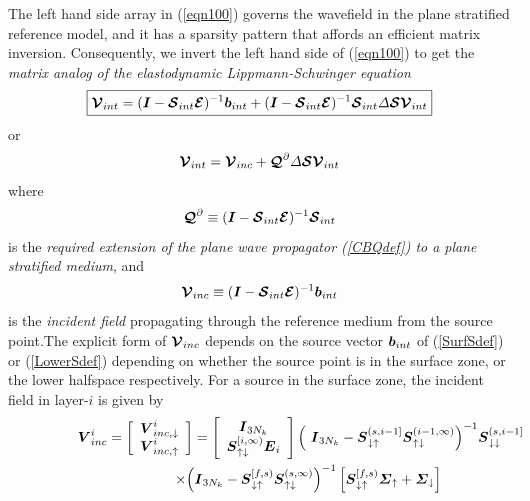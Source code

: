 The left hand side array in (\ref{eqn100}) governs the wavefield in the 
plane stratified reference model, and it has a sparsity pattern that 
affords an efficient matrix inversion. Consequently, we invert the left hand side 
of (\ref{eqn100}) to get the {\em matrix 
analog of the elastodynamic Lippmann-Schwinger equation\/}
\begin{equation} \label{LSmat}
\fbox{$\displaystyle
{\mbox{\boldmath$\cal V$\unboldmath}}_{{int}}=({\mbox{\boldmath$\mit I$\unboldmath}}-{\mbox{\boldmath$\cal S$\unboldmath}}_{{int}}{\mbox{\boldmath$\cal E$\unboldmath}})^{-1}{\mbox{\boldmath$\mit b$\unboldmath}}_{{int}}+
({\mbox{\boldmath$\mit I$\unboldmath}}-{\mbox{\boldmath$\cal S$\unboldmath}}_{{int}}{\mbox{\boldmath$\cal E$\unboldmath}})^{-1}{\mbox{\boldmath$\cal S$\unboldmath}}_{{int}} {\mit \Delta} 
{\mbox{\boldmath$\cal S$\unboldmath}}{\mbox{\boldmath$\cal V$\unboldmath}}_{{int}}
$}
\end{equation}
or
\[
{\mbox{\boldmath$\cal V$\unboldmath}}_{{int}}
={\mbox{\boldmath$\cal V$\unboldmath}}_{{inc}} + {\mbox{\boldmath$\cal Q$\unboldmath}}^{\partial} {\mit \Delta} {\mbox{\boldmath$\cal S$\unboldmath}}{\mbox{\boldmath$\cal V$\unboldmath}}_{{int}}
\]
where
\begin{equation}	\label{PstratDef}
	{\mbox{\boldmath$\cal Q$\unboldmath}}^{\partial}\equiv 
	({\mbox{\boldmath$\mit I$\unboldmath}}-{\mbox{\boldmath$\cal S$\unboldmath}}_{{int}}{\mbox{\boldmath$\cal E$\unboldmath}})^{-1}{\mbox{\boldmath$\cal S$\unboldmath}}_{{int}}
\end{equation}
is the {\em required extension of the plane wave propagator  (\ref{CBQdef}) to a plane stratified 
medium\/}, and
\begin{equation}	\label{sourceV}
	{\mbox{\boldmath$\cal V$\unboldmath}}_{{inc}}\equiv 
	({\mbox{\boldmath$\mit I$\unboldmath}}-{\mbox{\boldmath$\cal S$\unboldmath}}_{{int}}{\mbox{\boldmath$\cal E$\unboldmath}})^{-1}{\mbox{\boldmath$\mit b$\unboldmath}}_{{int}}
\end{equation}
is the {\em incident field\/} propagating through the reference medium 
from the source point.The  explicit form of ${\mbox{\boldmath$\cal V$\unboldmath}}_{{inc}}$
 depends on the source vector ${\mbox{\boldmath$\mit b$\unboldmath}}_{{int}}$ of (\ref{SurfSdef}) 
 or (\ref{LowerSdef}) depending on whether the source point is in the surface 
zone, or the lower halfspace respectively.
 For a source in the surface zone, the incident field in layer-$i$ is 
 given by 
\begin{eqnarray} \label{incdown}
\lefteqn{
{\bmi  V}_{{inc}}^{ i}=\left[{\begin{array}{c}{\bmi  V}_{{inc},\downarrow}^{ 
i}\\ 
{\bmi  V}_{{inc},\uparrow}^{ i}\end{array}}\right]=
\left[{\begin{array}{c}{\bmi  I}_{ 3 N_k}\\ 
{\bmi S}{}_{\uparrow\downarrow }^{[i, 
\infty)}{{\bmi E}}_{i}\end{array}}\right] {\left({\ {\bmi  I}_{ 3 N_k} -
{\bmi S}{}_{\downarrow\uparrow }^{({s} , {i-1} ]}{\bmi S}{}_{\uparrow 
\downarrow
}^{( {i-1} , \infty )} }\right)}^{-1} {\bmi S}{}_{\downarrow
\downarrow }^{( {s} , {i-1} ]}
}\nonumber\\ 
&&\qquad \qquad \qquad \times{\left({ {\bmi  I}_{ 3 N_k} - 
{\bmi S}{}_{\downarrow \uparrow }^{[ f , {s} )} {\bmi S}{}_{\uparrow
\downarrow }^{( {s} , \infty )} }\right)}^{-1}
\left[{\bmi S}{}_{\downarrow \uparrow }^{[f, {s})}{\bmi \Sigma}_{\uparrow}+ {\bmi 
\Sigma}_{\downarrow} \right]
\end{eqnarray}
